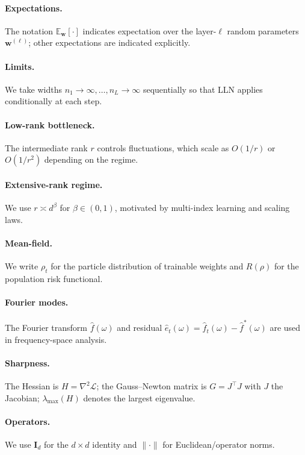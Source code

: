 \documentclass{article}
\begin{document}
\paragraph{Expectations.} The notation \( \mathbb{E}_{\bm{w}}[\cdot] \) indicates expectation over the layer-\( \ell \) random parameters \( \bm{w}^{(\ell)} \); other expectations are indicated explicitly.

\paragraph{Limits.} We take widths \( n_1\to\infty,\dots,n_L\to\infty \) sequentially so that LLN applies conditionally at each step.

\paragraph{Low-rank bottleneck.} The intermediate rank \( r \) controls fluctuations, which scale as \( O(1/r) \) or \( O(1/r^2) \) depending on the regime.

\paragraph{Extensive-rank regime.} We use \( r \asymp d^\beta \) for \( \beta \in (0,1) \), motivated by multi-index learning and scaling laws.

\paragraph{Mean-field.} We write \( \rho_t \) for the particle distribution of trainable weights and \( R(\rho) \) for the population risk functional.

\paragraph{Fourier modes.} The Fourier transform \( \hat{f}(\omega) \) and residual \( \hat{e}_t(\omega) = \hat{f}_t(\omega) - \hat{f}^*(\omega) \) are used in frequency-space analysis.

\paragraph{Sharpness.} The Hessian is \( H = \nabla^2 \mathcal{L} \); the Gauss–Newton matrix is \( G = J^\top J \) with \( J \) the Jacobian; \( \lambda_{\max}(H) \) denotes the largest eigenvalue.

\paragraph{Operators.} We use \( \mathbf{I}_d \) for the \( d\times d \) identity and \( \|\cdot\| \) for Euclidean/operator norms.
\end{document}
